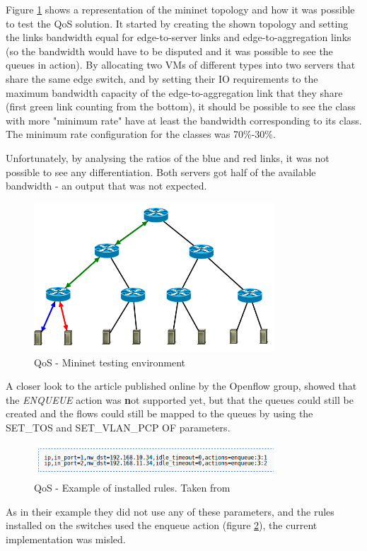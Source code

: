 \documentclass[12pt,english,oneside]{book}
\begin{document}
Figure \ref{fig:ofqos} shows a representation of the mininet topology and how it was possible to test the QoS solution.
It started by creating the shown topology and setting the links bandwidth equal for edge-to-server links and edge-to-aggregation links (so the bandwidth would have to be disputed and it was possible to see the queues in action).
By allocating two VMs of different types into two servers that share the same edge switch, and by setting their IO requirements to the maximum bandwidth capacity of the edge-to-aggregation link that they share (first green link counting from the bottom), it should be possible to see the class with more "minimum rate" have at least the bandwidth corresponding to its class.
The minimum rate configuration for the classes was 70\%-30\%.

Unfortunately, by analysing the ratios of the blue and red links, it was not possible to see any differentiation. Both servers got half of the available bandwidth - an output that was not expected.

\begin{figure}[h!tbp]
        \centering
        \includegraphics[width=0.8\textwidth]{figures/ofqos.png}
        \caption{QoS - Mininet testing environment}
        \label{fig:ofqos}
\end{figure}

A closer look to the article published online by the Openflow group\cite{qosof}, showed that the \textit{ENQUEUE} action was \textbf not supported yet, but that the queues could still be created and the flows could still be mapped to the queues by using the SET\_TOS and SET\_VLAN\_PCP OF parameters.
\begin{figure}[h!tbp]
        \centering
        \includegraphics[width=0.8\textwidth]{figures/ofqosexample.png}
        \caption{QoS - Example of installed rules. Taken from \cite{qosof}}
        \label{fig:ofqosexample}
\end{figure}
As in their example they did not use any of these parameters, and the rules installed on the switches used the enqueue action (figure \ref{fig:ofqosexample}), the current implementation was misled.
\end{document}
